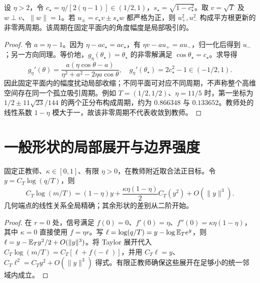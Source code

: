 \begin{proposition}[平方根外推的非零两周期]
\label{prop:root-extrapolation-cycle}
设 $\eta>2$，令 $c_\star=\eta/[2(\eta-1)]\in(1/2,1)$，$s_\star=\sqrt{1-c_\star^2}$。取 $v=\sqrt T$ 及 $w\perp v$、$\|w\|=1$。若 $u_\pm=c_\star v\pm s_\star w$ 都严格为正，则 $u_+^2,u_-^2$ 构成平方根更新的非零两周期。该周期在固定平面内的角度幅度是局部吸引的。
\end{proposition}
\begin{proof}
令 $a=\eta-1$。因为 $\eta-ac_\star=ac_\star$，有 $\eta v-au_+=au_-$，归一化后得到 $u_-$；另一方向同理。等价地，$g_\eta(\theta_\star)=\theta_\star$ 的非零解满足 $\cos\theta_\star=c_\star$。求导得
\begin{equation}
g_\eta'(\theta)=\frac{a(\eta\cos\theta-a)}{\eta^2+a^2-2\eta a\cos\theta},\quad
g_\eta'(\theta_\star)=2c_\star^2-1\in(-1/2,1).
\end{equation}
因此固定平面内的幅度扰动局部收缩；不同平面可对应不同周期，不声称整个高维空间存在同一个孤立吸引周期。例如 $T=(1/2,1/2)$、$\eta=11/5$ 时，第一坐标为 $1/2\pm11\sqrt{23}/144$ 的两个正分布构成周期，约为 $0.866348$ 与 $0.133652$。教师处的线性系数 $1-\eta$ 模大于一，故该非零周期不代表收敛到教师。
\end{proof}

\section{一般形状的局部展开与边界强度}
\label{sec:general-boundary-rate}
\begin{proposition}[教师中心对数坐标的二阶目标]
\label{prop:log-target-expansion}
固定正教师、$\kappa\in[0,1]$、有限 $\eta>0$，在教师附近取合法正目标。令 $y=C_T\log(q/T)$，则
\begin{equation}
C_T\log(m/T)=(1-\eta)y+
\frac{\kappa\eta(1-\eta)}2C_T(y^2)+O(\|y\|^3).
\end{equation}
几何端点的线性关系全局精确；其余形状的差别从二阶开始。
\end{proposition}
\begin{proof}
在 $r=0$ 处，信号满足 $f(0)=0$、$f'(0)=\eta$、$f''(0)=\kappa\eta(1-\eta)$，其中 $\kappa=0$ 直接使用 $f=\eta r$。写 $\ell=\log(q/T)=y-\log\mathbb E_Te^y$，则 $\ell=y-\mathbb E_Ty^2/2+O(\|y\|^3)$。将 Taylor 展开代入 $C_T\log(m/T)=C_T[\ell+f(-\ell)]$，并用 $C_T\ell=y$、$C_T\ell^2=C_Ty^2+O(\|y\|^3)$ 得式。有限正教师确保这些展开在足够小的统一邻域内成立。
\end{proof}

